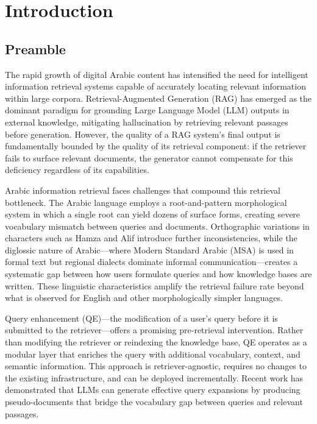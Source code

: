 \chapter{Introduction}
\label{chap:introduction}

\section{Preamble}
\label{sec:preamble}

The rapid growth of digital Arabic content has intensified the need for intelligent information retrieval systems capable of accurately locating relevant information within large corpora. Retrieval-Augmented Generation (RAG) has emerged as the dominant paradigm for grounding Large Language Model (LLM) outputs in external knowledge, mitigating hallucination by retrieving relevant passages before generation. However, the quality of a RAG system's final output is fundamentally bounded by the quality of its retrieval component: if the retriever fails to surface relevant documents, the generator cannot compensate for this deficiency regardless of its capabilities.

Arabic information retrieval faces challenges that compound this retrieval bottleneck. The Arabic language employs a root-and-pattern morphological system in which a single root can yield dozens of surface forms, creating severe vocabulary mismatch between queries and documents. Orthographic variations in characters such as Hamza and Alif introduce further inconsistencies, while the diglossic nature of Arabic---where Modern Standard Arabic (MSA) is used in formal text but regional dialects dominate informal communication---creates a systematic gap between how users formulate queries and how knowledge bases are written. These linguistic characteristics amplify the retrieval failure rate beyond what is observed for English and other morphologically simpler languages.

Query enhancement (QE)---the modification of a user's query before it is submitted to the retriever---offers a promising pre-retrieval intervention. Rather than modifying the retriever or reindexing the knowledge base, QE operates as a modular layer that enriches the query with additional vocabulary, context, and semantic information. This approach is retriever-agnostic, requires no changes to the existing infrastructure, and can be deployed incrementally. Recent work has demonstrated that LLMs can generate effective query expansions by producing pseudo-documents that bridge the vocabulary gap between queries and relevant passages.

